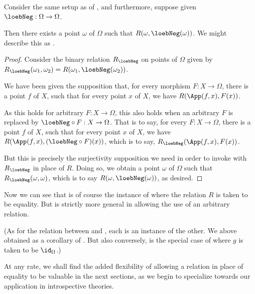 \label{RelatedlyFixedPointTheorem}
Consider the same setup as of , and furthermore, suppose given $\loebNeg : \Omega \to \Omega$.

Then there exists a point $\omega$ of $\Omega$ such that $R(\omega, \loebNeg(\omega))$. We might describe this as .
\begin{proof}
Consider the binary relation $R_{\loebNeg}$ on points of $\Omega$ given by $R_{\loebNeg}(\omega_1, \omega_2) = R(\omega_1, \loebNeg(\omega_2))$.

We have been given the supposition that, for every morphism $F : X \to \Omega$, there is a point $f$ of $X$, such that for every point $x$ of $X$, we have $R(\App(f, x), F(x))$.

As this holds for arbitrary $F : X \to \Omega$, this also holds when an arbitrary $F$ is replaced by $\loebNeg \circ F : X \to \Omega$. That is to say, for every $F : X \to \Omega$, there is a point $f$ of $X$, such that for every point $x$ of $X$, we have $R(\App(f, x), (\loebNeg \circ F)(x))$, which is to say, $R_{\loebNeg}(\App(f, x), F(x))$.

But this is precisely the surjectivity supposition we need in order to invoke  with $R_{\loebNeg}$ in place of $R$. Doing so, we obtain a point $\omega$ of $\Omega$ such that $R_{\loebNeg}(\omega, \omega)$, which is to say $R(\omega, \loebNeg(\omega))$, as desired.
\end{proof}

Now we can see that  is of course the instance of  where the relation $R$ is taken to be equality. But  is strictly more general in allowing the use of an arbitrary relation.

(As for the relation between  and , each is an instance of the other. We above obtained  as a corollary of . But also conversely,  is the special case of  where $g$ is taken to be $\id_{\Omega}$.)

At any rate, we shall find the added flexibility of allowing a relation in place of equality to be valuable in the next sections, as we begin to specialize towards our application in introspective theories.

